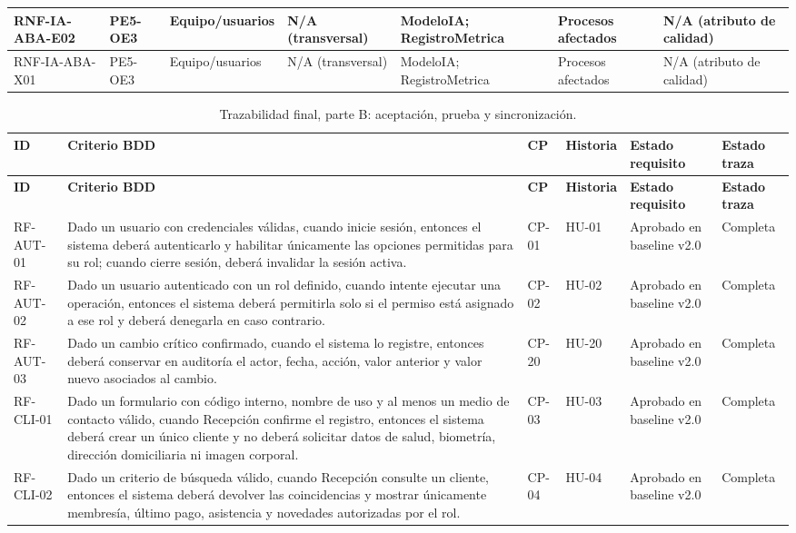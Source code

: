 \begin{landscape}
\begin{longtable}{|p{1.8cm}|p{3.4cm}|p{2.0cm}|p{1.4cm}|p{5.0cm}|p{4.0cm}|p{3.2cm}|}
RNF-IA-ABA-E02 & PE5-OE3 & Equipo/usuarios & N/A (transversal) & ModeloIA; RegistroMetrica & Procesos afectados & N/A (atributo de calidad) \\ \hline
RNF-IA-ABA-X01 & PE5-OE3 & Equipo/usuarios & N/A (transversal) & ModeloIA; RegistroMetrica & Procesos afectados & N/A (atributo de calidad) \\ \hline
\end{longtable}
\newpage
\begin{longtable}{|p{1.8cm}|p{11.8cm}|p{2.0cm}|p{2.0cm}|p{2.7cm}|p{2.0cm}|}
\caption{Trazabilidad final, parte B: aceptación, prueba y sincronización.}\\
\hline\textbf{ID} & \textbf{Criterio BDD} & \textbf{CP} & \textbf{Historia} & \textbf{Estado requisito} & \textbf{Estado traza}\\\hline\endfirsthead
\hline\textbf{ID} & \textbf{Criterio BDD} & \textbf{CP} & \textbf{Historia} & \textbf{Estado requisito} & \textbf{Estado traza}\\\hline\endhead
RF-AUT-01 & Dado un usuario con credenciales válidas, cuando inicie sesión, entonces el sistema deberá autenticarlo y habilitar únicamente las opciones permitidas para su rol; cuando cierre sesión, deberá invalidar la sesión activa. & CP-01 & HU-01 & Aprobado en baseline v2.0 & Completa \\ \hline
RF-AUT-02 & Dado un usuario autenticado con un rol definido, cuando intente ejecutar una operación, entonces el sistema deberá permitirla solo si el permiso está asignado a ese rol y deberá denegarla en caso contrario. & CP-02 & HU-02 & Aprobado en baseline v2.0 & Completa \\ \hline
RF-AUT-03 & Dado un cambio crítico confirmado, cuando el sistema lo registre, entonces deberá conservar en auditoría el actor, fecha, acción, valor anterior y valor nuevo asociados al cambio. & CP-20 & HU-20 & Aprobado en baseline v2.0 & Completa \\ \hline
RF-CLI-01 & Dado un formulario con código interno, nombre de uso y al menos un medio de contacto válido, cuando Recepción confirme el registro, entonces el sistema deberá crear un único cliente y no deberá solicitar datos de salud, biometría, dirección domiciliaria ni imagen corporal. & CP-03 & HU-03 & Aprobado en baseline v2.0 & Completa \\ \hline
RF-CLI-02 & Dado un criterio de búsqueda válido, cuando Recepción consulte un cliente, entonces el sistema deberá devolver las coincidencias y mostrar únicamente membresía, último pago, asistencia y novedades autorizadas por el rol. & CP-04 & HU-04 & Aprobado en baseline v2.0 & Completa \\ \hline

\end{longtable}
\end{landscape}

